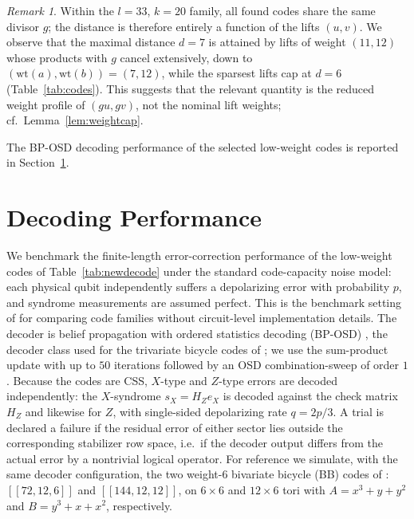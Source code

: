 \documentclass[journal,onecolumn]{IEEEtran}
\theoremstyle{definition}
\theoremstyle{remark}
\newtheorem{remark}[theorem]{Remark}
\newcommand{\wt}{\mathrm{wt}}
\begin{document}
\begin{remark}
Within the $l=33$, $k=20$ family, all found codes share the same divisor
$g$; the distance is therefore entirely a function of the lifts
$(u,v)$. We observe that the maximal distance $d=7$ is attained by lifts of
weight $(11,12)$ whose products with $g$ cancel extensively, down to
$(\wt(a),\wt(b))=(7,12)$, while the sparsest lifts cap at $d=6$
(Table~\ref{tab:codes}). This suggests that the relevant
quantity is the reduced weight profile of $(gu,gv)$, not the nominal
lift weights; cf.\ Lemma~\ref{lem:weightcap}.
\end{remark}

The BP-OSD decoding performance of the selected low-weight codes is
reported in Section~\ref{sec:decode}.


\section{Decoding Performance}\label{sec:decode}
We benchmark the finite-length error-correction performance of the
low-weight codes of Table~\ref{tab:newdecode} under the standard
code-capacity noise model: each physical qubit independently
suffers a depolarizing error with probability $p$, and syndrome
measurements are assumed perfect. This is the benchmark setting of
\cite{BB24,ITB} for comparing code families without circuit-level
implementation details. The decoder is belief propagation with ordered
statistics decoding (BP-OSD) \cite{PK21}, the decoder class used for the
trivariate bicycle codes of \cite{ITB}; we use the sum-product update
with up to $50$ iterations followed by an OSD combination-sweep of order
$1$. Because the codes are CSS, $X$-type and $Z$-type errors are decoded
independently: the $X$-syndrome $s_X=H_Z e_X$ is decoded against the
check matrix $H_Z$ and likewise for $Z$, with single-sided depolarizing
rate $q=2p/3$. A trial is declared a failure if the residual error of
either sector lies outside the corresponding stabilizer row space, i.e.\
if the decoder output differs from the actual error by a nontrivial
logical operator. For reference we simulate, with the same decoder
configuration, the two weight-$6$ bivariate bicycle (BB) codes of
\cite{BB24}: $[[72,12,6]]$ and $[[144,12,12]]$, on $6\times6$ and
$12\times6$ tori with $A=x^3+y+y^2$ and $B=y^3+x+x^2$, respectively.
\end{document}
